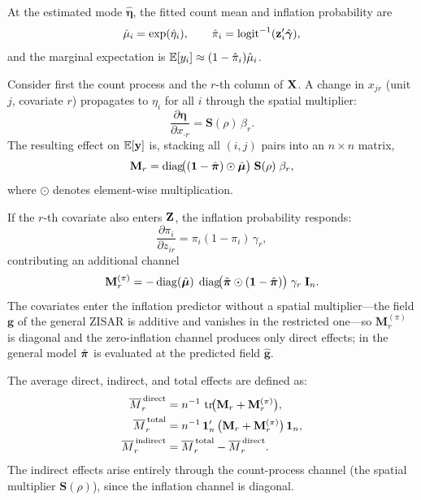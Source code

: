 At the estimated mode $\hat{\boldsymbol{\eta}}$, the fitted count mean and inflation probability are
\begin{equation}\label{eq:fitted}
  \hat{\mu}_i = \exp(\hat{\eta}_i), \qquad \hat{\pi}_i = \operatorname{logit}^{-1}(\mathbf{z}_i'\hat{\boldsymbol{\gamma}}),
\end{equation}
and the marginal expectation is $\mathbb{E}[y_i] \approx (1 - \hat{\pi}_i)\hat{\mu}_i$.

Consider first the count process and the $r$-th column of $\mathbf{X}$.
A change in $x_{jr}$ (unit $j$, covariate $r$) propagates to $\eta_i$ for all $i$ through the spatial multiplier:
\begin{equation}\label{eq:deta_dx}
  \frac{\partial\boldsymbol{\eta}}{\partial x_{\cdot r}} = \mathbf{S}(\rho)\,\beta_r.
\end{equation}
The resulting effect on $\mathbb{E}[\mathbf{y}]$ is, stacking all $(i,j)$ pairs into an $n \times n$ matrix,
\begin{equation}\label{eq:effects_count}
  \mathbf{M}_r = \operatorname{diag}\!\bigl((\mathbf{1}-\hat{\boldsymbol{\pi}})\odot\hat{\boldsymbol{\mu}}\bigr)\;\mathbf{S}(\rho)\;\beta_r,
\end{equation}
where $\odot$ denotes element-wise multiplication.

If the $r$-th covariate also enters $\mathbf{Z}$, the inflation probability responds:
\begin{equation}\label{eq:effects_zero}
  \frac{\partial\pi_i}{\partial z_{ir}} = \pi_i(1-\pi_i)\,\gamma_r,
\end{equation}
contributing an additional channel
\begin{equation}\label{eq:effects_zero_channel}
  \mathbf{M}_r^{(\pi)} = -\operatorname{diag}(\hat{\boldsymbol{\mu}})\;\operatorname{diag}\!\bigl(\hat{\boldsymbol{\pi}}\odot(\mathbf{1}-\hat{\boldsymbol{\pi}})\bigr)\;\gamma_r\;\mathbf{I}_n.
\end{equation}
The covariates enter the inflation predictor without a spatial multiplier---the field $\mathbf{g}$ of the general ZISAR is additive and vanishes in the restricted one---so $\mathbf{M}_r^{(\pi)}$ is diagonal and the zero-inflation channel produces only direct effects; in the general model $\hat{\boldsymbol{\pi}}$ is evaluated at the predicted field $\hat{\mathbf{g}}$.

The average direct, indirect, and total effects are defined as:
\begin{align}
  \overline{M}_r^{\,\mathrm{direct}} &= n^{-1}\,\operatorname{tr}\!\bigl(\mathbf{M}_r + \mathbf{M}_r^{(\pi)}\bigr), \label{eq:avg_direct} \\
  \overline{M}_r^{\,\mathrm{total}}  &= n^{-1}\,\mathbf{1}_n'\,\bigl(\mathbf{M}_r + \mathbf{M}_r^{(\pi)}\bigr)\,\mathbf{1}_n, \label{eq:avg_total} \\
  \overline{M}_r^{\,\mathrm{indirect}} &= \overline{M}_r^{\,\mathrm{total}} - \overline{M}_r^{\,\mathrm{direct}}. \label{eq:avg_indirect}
\end{align}
The indirect effects arise entirely through the count-process channel (the spatial multiplier $\mathbf{S}(\rho)$), since the inflation channel is diagonal.

